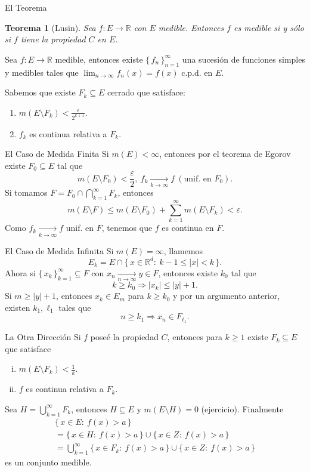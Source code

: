 \documentclass[utf8]{beamer}
\theoremstyle{plain}
\newtheorem{Th}{Teorema}               %
\theoremstyle{definition}
\theoremstyle{remark}
\numberwithin{equation}{section}
\newcommand{\eps}{\varepsilon}          %
\newcommand{\bR}{\mathbb{R}}    %
\newcommand{\set}[1]{\{\,#1\,\}}    %
\renewcommand{\geq}{\geqslant}          %
\renewcommand{\l}{\ell}                   %
\renewcommand{\leq}{\leqslant}          %
\newcommand{\less}{\setminus}           %
\newcommand{\To}{\Rightarrow}
\newcommand{\suck}{_{k=1}^\infty} %
\newcommand{\sucn}{_{n=1}^\infty} %
\renewcommand{\.}{\Cdot}                %
\begin{document}
\begin{frame}{El Teorema}
  \begin{Th}[Lusin]\label{th:Lusin}
    Sea $f:E\to\bR$ con $E$ medible. Entonces $f$ es medible si y sólo si $f$ tiene la propiedad $C$ en $E$.
  \end{Th}
  Sea $f:E\to\bR$ medible, entonces existe $\set{f_n}\sucn$ una sucesión de funciones simples y medibles tales que $\lim_{n\to\infty}f_n(x)=f(x)$ c.p.d. en $E$.\par 
  Sabemos que existe $F_k\subseteq E$ cerrado que satisface:
  \begin{enumerate}
    \item $m(E\less F_k)<\frac{\eps}{2^{k+1}}$.
    \item $f_k$ es continua relativa a $F_k$.  
  \end{enumerate}
\end{frame}

\begin{frame}{El Caso de Medida Finita}
  Si $m(E)<\infty$, entonces por el teorema de Egorov existe $F_0\subseteq E$ tal que 
  $$m(E\less F_0)<\frac{\eps}{2},\ f_k\xrightarrow[k\to\infty]{}f\ (\text{unif. en }F_0).$$
  Si tomamos $F=F_0\cap\bigcap\suck F_k$, entonces 
  $$m(E\less F)\leq m(E\less F_0)+\sum\suck m(E\less F_k)<\eps.$$
  Como $f_k\xrightarrow[k\to\infty]{}f$ unif. en $F$, tenemos que $f$ es continua en $F$.
\end{frame}

\begin{frame}{El Caso de Medida Infinita}
  Si $m(E)=\infty$, llamemos 
  $$E_k=E\cap \set{x\in\bR^d:\ k-1\leq |x|<k}.$$
  Ahora si $\set{x_k}\suck\subseteq F$ con $x_n\xrightarrow[n\to\infty]{}y\in F$, entonces existe $k_0$ tal que 
  $$k\geq k_0\To |x_k|\leq |y|+1.$$
  Si $m\geq |y|+1$, entonces $x_k\in E_m$ para $k\geq k_0$ y por un argumento anterior, existen $k_1,\l_1$ tales que 
  $$n\geq k_1\To x_n\in F_{\l_1}.$$
\end{frame}

\begin{frame}{La Otra Dirección}\label{ej:dirContrariaLusin}
  Si $f$ poseé la propiedad $C$, entonces para $k\geq 1$ existe $F_k\subseteq E$ que satisface
  \begin{enumerate}[(i)]
    \item $m(E\less F_k)<\frac1k$.
    \item $f$ es continua relativa a $F_k$.
  \end{enumerate}
  Sea $H=\bigcup\suck F_k$, entonces $H\subseteq E$ y $m(E\less H)=0$ (\alert{ejercicio}). Finalmente 
  \begin{gather*}
    \set{x\in E:\ f(x)>a}\\
    =\set{x\in H:\ f(x)>a}\cup \set{x\in Z:\ f(x)>a}\\
    =\bigcup\suck\set{x\in F_k:\ f(x)>a} \cup\set{x\in Z:\ f(x)>a}
  \end{gather*}
  es un conjunto medible.
\end{frame}
\end{document}
